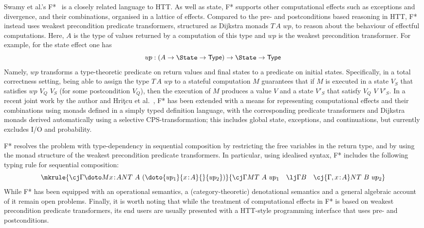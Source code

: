 Swamy et al.'s F*~\cite{Swamy:FStar} is a closely related language to HTT.
As well as state, F* supports other computational effects such as exceptions and divergence, and their combinations, organised in a lattice of effects.
Compared to the pre- and postconditions based reasoning in HTT, F* instead uses weakest precondition predicate transformers, structured as Dijkstra monads $T\, A\,\, w\!p$, to reason about the behaviour of effectful computations. Here, $A$ is the type of values returned by a computation of this type and $w\!p$ is the weakest precondition transformer. %
For example, for the state effect one has
\[
w\!p : (A \to \State \to \mathsf{Type}) \to \State \to \mathsf{Type}
\]
Namely, $w\!p$ transforms a type-theoretic predicate on return values and final states to a predicate on  initial states. Specifically, in a total correctness setting, being able to assign the type $T\, A\,\, w\!p$ to a stateful computation $M$ guarantees that if $M$ is executed in a state $V_S$ that satisfies $w\!p\,\, V_{\!Q}\,\, V_{\!S}$ (for some postcondition $V_{\!Q}$), then the execution of $M$ produces a value $V$ and a state $V'_{\!S}$ that satisfy $V_{\!Q}\,\, V\,\, V'_{S}$.
In a recent joint work by the author and Hri{\c t}cu et al.~\cite{Ahman:DM4Free}, F* has been extended with a means for representing computational effects and their combinations using monads defined in a simply typed definition language, with the corresponding predicate transformers and Dijkstra monads derived automatically using a selective CPS-transformation; this includes global state, exceptions, and continuations, but currently excludes I/O and probability.

F* resolves the problem with type-dependency in sequential composition by restricting the free variables in the return type, and by using the monad structure of the weakest precondition predicate transformers. In particular, using idealised syntax, F* includes the following typing rule for sequential composition: 
\vspace{0.15cm}
\[
\mkrule
{\cj \Gamma {\doto M {x \!:\! A} {} N} {T~A~(\doto {w\!p_1} {x \!:\! A} {} {w\!p_2})}}
{
\cj \Gamma M T~A~w\!p_1
\quad
\lj \Gamma B
\quad
\cj {\Gamma, x \!:\! A} N T~B~w\!p_2
}
\vspace{-0.1cm}
\]
While F* has been equipped with an operational semantics, a (category-theoretic) denotational semantics and a general algebraic account of it remain open problems. 
Finally, it is worth noting that while the treatment of computational effects in F* is based on weakest precondition predicate transformers, its end users are usually presented with a HTT-style programming interface that uses pre- and postconditions.

